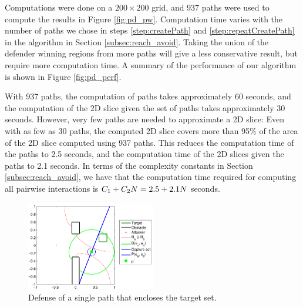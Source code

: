 Computations were done on a $200\times200$ grid, and 937 paths were used to compute the results in Figure \ref{fig:pd_pw}. Computation time varies with the number of paths we chose in steps \ref{step:createPath} and \ref{step:repeatCreatePath} in the algorithm in Section \ref{subsec:reach_avoid}. Taking the union of the defender winning regions from more paths will give a less conservative result, but require more computation time. A summary of the performance of our algorithm is shown in Figure \ref{fig:pd_perf}. 

With 937 paths, the computation of paths takes approximately 60 seconds, and the computation of the 2D slice given the set of paths takes approximately 30 seconds. However, very few paths are needed to approximate a 2D slice: Even with as few as 30 paths, the computed 2D slice covers more than 95\% of the area of the 2D slice computed using 937 paths. This reduces the computation time of the paths to 2.5 seconds, and the computation time of the 2D slices given the paths to 2.1 seconds. In terms of the complexity constants in Section \ref{subsec:reach_avoid}, we have that the computation time required for computing all pairwise interactions is $C_1 + C_2 N = 2.5 + 2.1 N$ seconds.

\begin{figure}
	\centering
	\includegraphics[width=0.5\textwidth]{"fig/PD Example"}
	\caption{Defense of a single path that encloses the target set.}
	\label{fig:pd_ex}
\end{figure}

